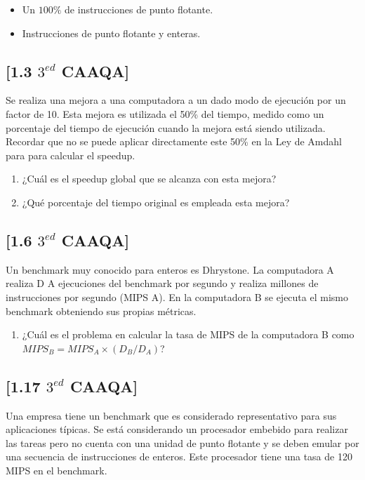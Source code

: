 \begin{itemize}
    \item Un $100\%$ de instrucciones de punto flotante.
    \item Instrucciones de punto flotante y enteras.
\end{itemize}


\subsection{[1.3 $3^{ed}$ CAAQA]}
Se realiza una mejora a una computadora a un dado modo de ejecución por un factor de 10. Esta mejora es utilizada el 50\% del tiempo, medido como un porcentaje del tiempo de ejecución cuando la mejora está siendo utilizada. Recordar que no se puede aplicar directamente este 50\% en la Ley de Amdahl para para calcular el speedup.

\begin{enumerate}
 \item ¿Cuál es el speedup global que se alcanza con esta mejora?
 \item ¿Qué porcentaje del tiempo original es empleada esta mejora?
\end{enumerate}


\subsection{[1.6 $3^{ed}$ CAAQA]}
Un benchmark muy conocido para enteros es Dhrystone. La computadora A realiza D A ejecuciones del benchmark por segundo y realiza millones de instrucciones por segundo (MIPS A). En la computadora B se ejecuta el mismo benchmark obteniendo sus propias métricas.

\begin{enumerate}
 \item ¿Cuál es el problema en calcular la tasa de MIPS de la computadora B como $MIPS_B = MIPS_A \times (D_B / D_A )$?
\end{enumerate}



\subsection{[1.17 $3^{ed}$ CAAQA]}
Una empresa tiene un benchmark que es considerado representativo para sus aplicaciones típicas. Se está considerando un procesador embebido para realizar las tareas pero no cuenta con una unidad de punto flotante y se deben emular por una secuencia de instrucciones de enteros. Este procesador tiene una tasa de 120 MIPS en el benchmark.

